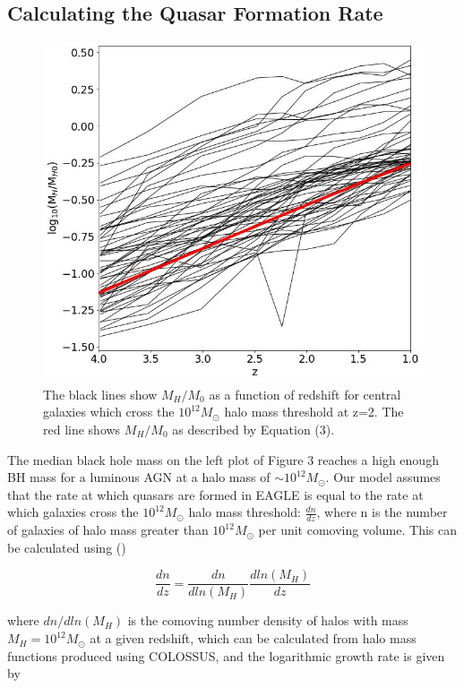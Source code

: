 \documentclass[12pt, twocolumn]{article}%
\begin{document}
 \subsection{Calculating the Quasar Formation Rate}

 \begin{figure}[H]
\centering
\includegraphics[width=\linewidth]{Plot_5.jpeg}
\caption{The black lines show $M_H/M_0$ as a function of redshift for central galaxies which cross the $10^{12}M_\odot$ halo mass threshold at z=2. The red line shows $M_H/M_0$ as described by Equation (3).}
\label{fig:5}
\end{figure}

The median black hole mass on the left plot of Figure 3 reaches a high enough BH mass for a luminous AGN at a halo mass of $\sim10^{12}M_\odot$. Our model assumes that the rate at which quasars are formed in EAGLE is equal to the rate at which galaxies cross the $10^{12}M_\odot$ halo mass threshold: $\frac{dn}{dz}$, where n is the number of galaxies of halo mass greater than $10^{12}M_\odot$ per unit comoving volume. This can be calculated using (\cite{Correa})

\begin{equation}
    \frac{dn}{dz}=\frac{dn}{dln(M_H)}\frac{dln(M_H)}{dz}
\end{equation}

\noindent where $dn/dln(M_H)$ is the comoving number density of halos with mass $M_H=10^{12}M_\odot$ at a given redshift, which can be calculated from halo mass functions produced using COLOSSUS, and the logarithmic growth rate is given by
\end{document}
